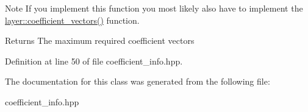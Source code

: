 \begin{DoxyNote}{Note}
If you implement this function you most likely also have to implement the \hyperlink{group__coefficient__storage__api_gad1eec7417e960f93e39d6b12cfab1d53}{layer\-::coefficient\-\_\-vectors()} function.
\end{DoxyNote}
\begin{DoxyReturn}{Returns}
The maximum required coefficient vectors 
\end{DoxyReturn}


Definition at line 50 of file coefficient\-\_\-info.\-hpp.



The documentation for this class was generated from the following file\-:\begin{DoxyCompactItemize}
\item 
coefficient\-\_\-info.\-hpp\end{DoxyCompactItemize}
